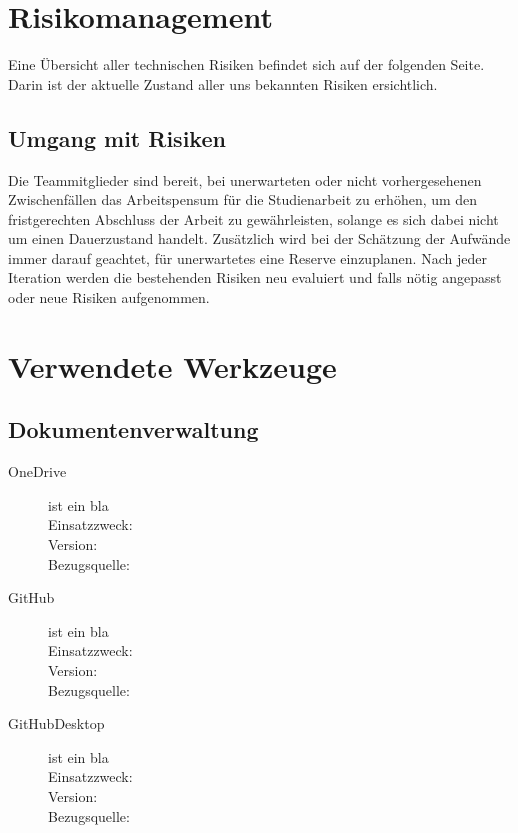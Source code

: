 \documentclass[12pt, a4paper]{report}
\begin{document}
	
	\chapter{Risikomanagement}
	Eine Übersicht aller technischen Risiken befindet sich auf der folgenden Seite. Darin ist der aktuelle Zustand aller uns bekannten Risiken ersichtlich.
	
	\section{Umgang mit Risiken}
	Die Teammitglieder sind bereit, bei unerwarteten oder nicht vorhergesehenen Zwischenfällen das Arbeitspensum für die Studienarbeit zu erhöhen, um den fristgerechten Abschluss der Arbeit zu gewährleisten, solange es sich dabei nicht um einen Dauerzustand handelt. Zusätzlich wird bei der Schätzung der Aufwände immer darauf geachtet, für unerwartetes eine Reserve einzuplanen.
	Nach jeder Iteration werden die bestehenden Risiken neu evaluiert und falls nötig angepasst oder neue Risiken aufgenommen.
	
	 

	\chapter{Verwendete Werkzeuge}
	
	
	
	
	
	\section{Dokumentenverwaltung}
	
	\begin{description}
		\item [OneDrive] ist ein bla \\
		Einsatzzweck: \\
		Version: \\
		Bezugsquelle: \\
		
		
		\item [GitHub] ist ein bla \\
		Einsatzzweck: \\
		Version: \\
		Bezugsquelle: \\
		
		
		\item [GitHubDesktop] ist ein bla \\
		Einsatzzweck: \\
		Version: \\
		Bezugsquelle: \\
	\end{description}
	
\end{document}

